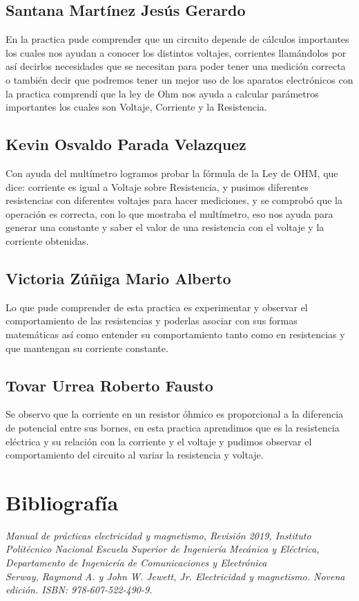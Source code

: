 \documentclass[11pt]{article}
\begin{document}
\begin{multicols}{2}
		\subsection{Santana Martínez Jesús Gerardo}

			En la practica pude comprender que un circuito depende de cálculos importantes los cuales nos ayudan a conocer los distintos voltajes, corrientes llamándolos por así decirlos necesidades que se necesitan para poder tener una medición correcta o también decir que podremos tener un mejor uso de los aparatos electrónicos con la practica comprendí que  la ley de Ohm nos ayuda a calcular parámetros importantes los cuales son Voltaje, Corriente y la Resistencia.

		\subsection{Kevin Osvaldo Parada Velazquez}
			Con ayuda del multímetro logramos probar la fórmula de la Ley de OHM, que dice: corriente es igual a Voltaje sobre Resistencia, y pusimos diferentes resistencias con diferentes voltajes para hacer mediciones, y se comprobó que la operación es correcta, con lo que mostraba el multímetro, eso nos ayuda para generar una constante y saber el valor de una resistencia con el voltaje y la corriente obtenidas.

		\subsection{Victoria Zúñiga Mario Alberto}

			 Lo que pude comprender de esta practica  es experimentar y observar el comportamiento de las resistencias y poderlas asociar con sus formas matemáticas así como entender su comportamiento tanto como en resistencias y  que  mantengan su corriente constante. 

		\subsection{Tovar Urrea Roberto Fausto}

			Se observo que la corriente en un resistor óhmico es proporcional a la diferencia de potencial entre sus bornes, en esta practica aprendimos que es la resistencia eléctrica y su relación con la corriente y el voltaje y pudimos observar el comportamiento del circuito al variar la resistencia y voltaje.												

\section{Bibliografía}

\textit{Manual de prácticas electricidad y magnetismo, Revisión 2019, Instituto Politécnico Nacional Escuela Superior de Ingeniería Mecánica y Eléctrica, Departamento de Ingeniería de Comunicaciones y Electrónica}\\
\textit{Serway, Raymond A. y John W. Jewett, Jr. Electricidad y magnetismo. Novena edición. ISBN: 978-607-522-490-9.}

\end{multicols}
\end{document}
